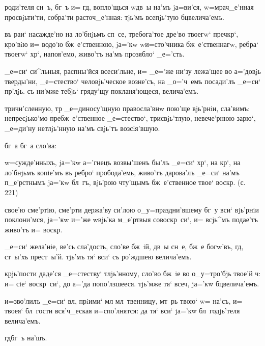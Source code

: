 
  роди'теля сн~ъ, бг~ъ и= 
гд, вопло'щься w\т дв~ы на'мъ jа=ви'ся, w=мрач_е'нная 
просвjьти'ти, собра'ти расточ_е'нная: тjь'мъ всепjь'тую 
бц велича'емъ.

 въ раи` насажде'но на ло'бнjьмъ сп~се, 
требога'тое дре'во твоегw` преч кр`, кро'вiю и= 
водо'ю бж~е'ственною, jа='кw w\т и=сто'чника 
бж~е'ственнагw, ребра` твоегw` хр`, напоя'емо, 
живо'тъ на'мъ прозябло` _е='сть.

 _е=си` си^льныя, распны'йся всеси'льне, 
и= _е='же ни'зу лежа'щее во а='довjь тверды'ни, 
_е=стество` человjь'ческое возне'съ, на _о='ч~емъ 
посади'лъ _е=си` пр'лjь. съ ни'мже тебjь` гряду'щу 
покланя'ющеся, велича'емъ.

  тричи'сленную, тр 
_е=диносу'щную правосла'внw пою'ще вjь'рнiи, сла'вимъ: 
непресjько'мо пребж~е'ственное _е=стество`, трисвjь'тлую, 
невече'рнюю зарю`, _е=ди'ну нетлjь'нную на'мъ свjь'тъ 
возсiя'вшую.

 бг~а бг~а сло'ва:

 w=сужде'нныхъ, jа='кw а='гнецъ 
возвы'шенъ бы'лъ _е=си` хр`, на кр`, на 
ло'бнjьмъ копiе'мъ въ ребро` пробода'емь, живо'тъ 
дарова'лъ _е=си` на'мъ п_е'рстнымъ jа='кw бл~гъ, вjь'рою 
чту'щымъ бж~е'ственное твое` воскр. (с. 221)

 свое'ю сме'ртiю, сме'рти держа'ву си'лою 
о_у=праздни'вшему бг~у вси` вjь'рнiи поклони'мся, jа='кw 
и='же w\т вjь'ка м_е'ртвыя совоскр~си`, и= всjь^мъ 
подае'тъ живо'тъ и= воскр.


  _е=си` жела'нiе, ве'сь сла'дость, 
сло'ве бж~iй, дв~ы сн~е, бж~е богw'въ, гд, ст~ы'хъ 
прест~ы'й. тjь'мъ тя` вси` съ ро'ждшею велича'емъ.

 крjь'пости даде'ся _е=стеству` тлjь'нному, 
сло'во бж~iе во о_у=тро'бjь твое'й ч: и= сiе` 
воскр~си`, до а='да попо'лзшееся. тjь'мже тя` всеч, 
jа='кw бц велича'емъ.

 и=зво'лилъ _е=си` вл, прiими` мл 
мл~твенницу, мт~рь твою` w= на'съ, и= твоея` бл~гости 
вся'ч_еская и=спо'лнятся: да тя` вси` jа='кw 
бл~годjь'теля велича'емъ.

      
гд бг~ъ на'шъ. 

